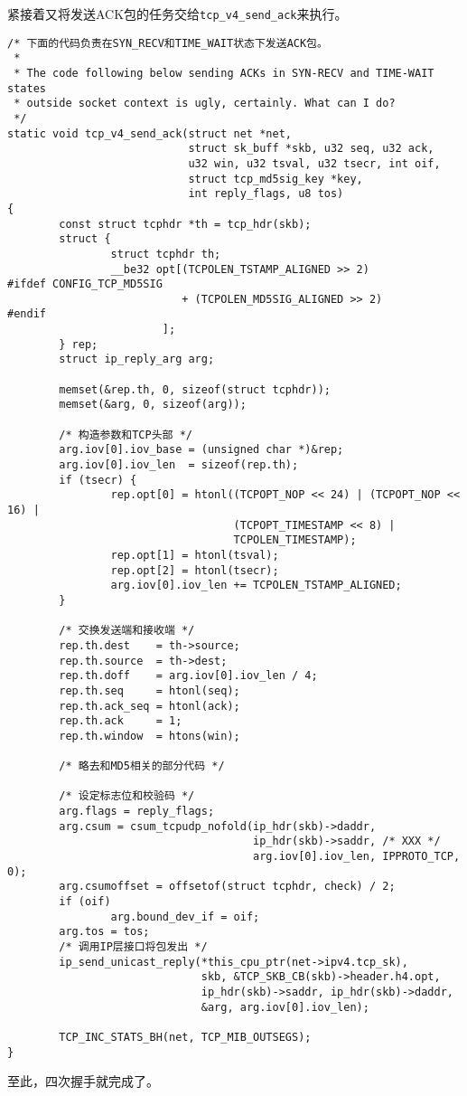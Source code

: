 	紧接着又将发送ACK包的任务交给\texttt{tcp_v4_send_ack}来执行。
\begin{verbatim}
/* 下面的代码负责在SYN_RECV和TIME_WAIT状态下发送ACK包。
 *
 * The code following below sending ACKs in SYN-RECV and TIME-WAIT states
 * outside socket context is ugly, certainly. What can I do? 
 */
static void tcp_v4_send_ack(struct net *net,
                            struct sk_buff *skb, u32 seq, u32 ack,
                            u32 win, u32 tsval, u32 tsecr, int oif,
                            struct tcp_md5sig_key *key,
                            int reply_flags, u8 tos)
{
        const struct tcphdr *th = tcp_hdr(skb);
        struct {
                struct tcphdr th;
                __be32 opt[(TCPOLEN_TSTAMP_ALIGNED >> 2)
#ifdef CONFIG_TCP_MD5SIG
                           + (TCPOLEN_MD5SIG_ALIGNED >> 2)
#endif
                        ];
        } rep;
        struct ip_reply_arg arg;

        memset(&rep.th, 0, sizeof(struct tcphdr));
        memset(&arg, 0, sizeof(arg));

        /* 构造参数和TCP头部 */
        arg.iov[0].iov_base = (unsigned char *)&rep;
        arg.iov[0].iov_len  = sizeof(rep.th);
        if (tsecr) {
                rep.opt[0] = htonl((TCPOPT_NOP << 24) | (TCPOPT_NOP << 16) |
                                   (TCPOPT_TIMESTAMP << 8) |
                                   TCPOLEN_TIMESTAMP);
                rep.opt[1] = htonl(tsval);
                rep.opt[2] = htonl(tsecr);
                arg.iov[0].iov_len += TCPOLEN_TSTAMP_ALIGNED;
        }

        /* 交换发送端和接收端 */
        rep.th.dest    = th->source;
        rep.th.source  = th->dest;
        rep.th.doff    = arg.iov[0].iov_len / 4;
        rep.th.seq     = htonl(seq);
        rep.th.ack_seq = htonl(ack);
        rep.th.ack     = 1;
        rep.th.window  = htons(win);

        /* 略去和MD5相关的部分代码 */

        /* 设定标志位和校验码 */
        arg.flags = reply_flags;
        arg.csum = csum_tcpudp_nofold(ip_hdr(skb)->daddr,
                                      ip_hdr(skb)->saddr, /* XXX */
                                      arg.iov[0].iov_len, IPPROTO_TCP, 0);
        arg.csumoffset = offsetof(struct tcphdr, check) / 2;
        if (oif)
                arg.bound_dev_if = oif;
        arg.tos = tos;
        /* 调用IP层接口将包发出 */
        ip_send_unicast_reply(*this_cpu_ptr(net->ipv4.tcp_sk),
                              skb, &TCP_SKB_CB(skb)->header.h4.opt,
                              ip_hdr(skb)->saddr, ip_hdr(skb)->daddr,
                              &arg, arg.iov[0].iov_len);

        TCP_INC_STATS_BH(net, TCP_MIB_OUTSEGS);
}
\end{verbatim}
至此，四次握手就完成了。

